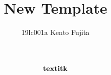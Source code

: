 \documentclass[12pt,a4pepar]{article}
\title{New Template}
\author{19lc001a Kento Fujita}
\theoremstyle{definition}
\theoremstyle{remark}
\numberwithin{equation}{section}
\renewcommand{\boldsymbol}[1]{\text{\bf textit{#1}}}
\begin{document}
\maketitle
\begin{equation}
    \boldsymbol{k}
\end{equation}
\end{document}

